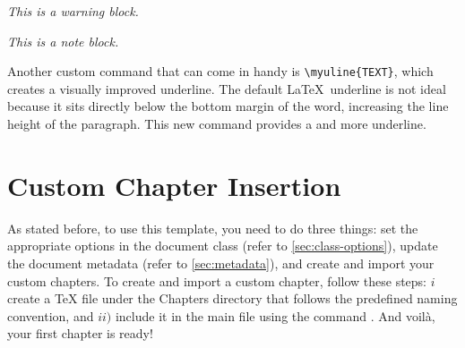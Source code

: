 {\begin{tcbraster}[
    raster columns=2, 
    raster equal height, 
    nobeforeafter, 
    raster column skip=2cm
]
\begin{block}[warning]
    \textit{This is a warning block.}
\end{block}
\begin{block}[note]
    \textit{This is a note block.}
\end{block}
\end{tcbraster}
\vspace{.875em}

Another custom command that can come in handy is \verb|\myuline{TEXT}|, which creates a visually improved underline. The default \LaTeX~underline is not ideal because it sits directly below the bottom margin of the word, increasing the line height of the paragraph. This new command provides a  and more  underline.

\section{Custom Chapter Insertion}
As stated before, to use this template, you need to do three things: set the appropriate options in the document class (refer to \autoref{sec:class-options}), update the document metadata (refer to \autoref{sec:metadata}), and create and import your custom chapters. To create and import a custom chapter, follow these steps: \(i\) create a TeX file under the Chapters directory that follows the predefined naming convention, and \(ii)\) include it in the main file using the command \verb||. And voilà, your first chapter is ready!
}